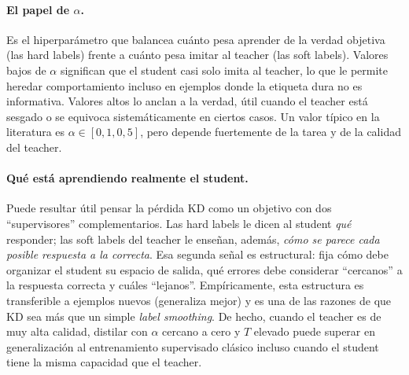 \documentclass[11pt,a4paper]{article}
\begin{document}
\paragraph{El papel de $\alpha$.} Es el hiperparámetro que balancea cuánto pesa aprender de la verdad objetiva (las hard labels) frente a cuánto pesa imitar al teacher (las soft labels). Valores bajos de $\alpha$ significan que el student casi solo imita al teacher, lo que le permite heredar comportamiento incluso en ejemplos donde la etiqueta dura no es informativa. Valores altos lo anclan a la verdad, útil cuando el teacher está sesgado o se equivoca sistemáticamente en ciertos casos. Un valor típico en la literatura es $\alpha \in [0{,}1, 0{,}5]$, pero depende fuertemente de la tarea y de la calidad del teacher.

\paragraph{Qué está aprendiendo realmente el student.} Puede resultar útil pensar la pérdida KD como un objetivo con dos ``supervisores'' complementarios. Las hard labels le dicen al student \emph{qué} responder; las soft labels del teacher le enseñan, además, \emph{cómo se parece cada posible respuesta a la correcta}. Esa segunda señal es estructural: fija cómo debe organizar el student su espacio de salida, qué errores debe considerar ``cercanos'' a la respuesta correcta y cuáles ``lejanos''. Empíricamente, esta estructura es transferible a ejemplos nuevos (generaliza mejor) y es una de las razones de que KD sea más que un simple \textit{label smoothing}. De hecho, cuando el teacher es de muy alta calidad, distilar con $\alpha$ cercano a cero y $T$ elevado puede superar en generalización al entrenamiento supervisado clásico incluso cuando el student tiene la misma capacidad que el teacher.
\end{document}
